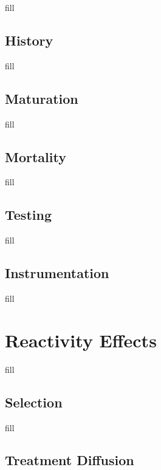 \documentclass[
  b5paper]{book}
\begin{document}
fill

\hypertarget{history-1}{%
\subsection*{History}\label{history-1}}

fill

\hypertarget{maturation}{%
\subsection*{Maturation}\label{maturation}}

fill

\hypertarget{mortality}{%
\subsection*{Mortality}\label{mortality}}

fill

\hypertarget{testing}{%
\subsection*{Testing}\label{testing}}

fill

\hypertarget{instrumentation}{%
\subsection*{Instrumentation}\label{instrumentation}}

fill

\hypertarget{reactivity-effects}{%
\section{Reactivity Effects}\label{reactivity-effects}}

fill

\hypertarget{selection}{%
\subsection*{Selection}\label{selection}}

fill

\hypertarget{treatment-diffusion}{%
\subsection*{Treatment Diffusion}\label{treatment-diffusion}}
\end{document}
